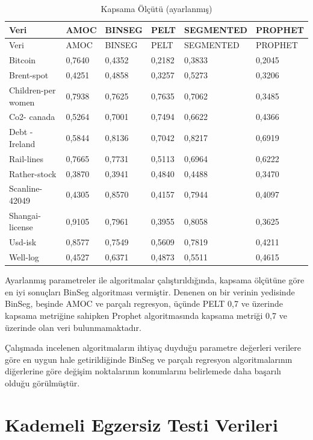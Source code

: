 \documentclass[12pt,twoside]{deuthesis}
\begin{document}
\begin{longtable}[]{@{}llllll@{}}
\caption{\label{tab:nvar5} Kapsama Ölçütü (ayarlanmış)}\tabularnewline
\toprule\noalign{}
Veri & AMOC & BINSEG & PELT & SEGMENTED & PROPHET \\
\midrule\noalign{}
\endfirsthead
\toprule\noalign{}
Veri & AMOC & BINSEG & PELT & SEGMENTED & PROPHET \\
\midrule\noalign{}
\endhead
\bottomrule\noalign{}
\endlastfoot
Bitcoin & 0,7640 & 0,4352 & 0,2182 & 0,3833 & 0,2045 \\
Brent-spot & 0,4251 & 0,4858 & 0,3257 & 0,5273 & 0,3206 \\
Children-per women & 0,7938 & 0,7625 & 0,7635 & 0,7062 & 0,3485 \\
Co2- canada & 0,5264 & 0,7001 & 0,7494 & 0,6622 & 0,4366 \\
Debt -Ireland & 0,5844 & 0,8136 & 0,7042 & 0,8217 & 0,6919 \\
Rail-lines & 0,7665 & 0,7731 & 0,5113 & 0,6964 & 0,6222 \\
Rather-stock & 0,3870 & 0,3941 & 0,4840 & 0,4488 & 0,3470 \\
Scanline-42049 & 0,4305 & 0,8570 & 0,4157 & 0,7944 & 0,4097 \\
Shangai-license & 0,9105 & 0,7961 & 0,3955 & 0,8058 & 0,3625 \\
Usd-isk & 0,8577 & 0,7549 & 0,5609 & 0,7819 & 0,4211 \\
Well-log & 0,4527 & 0,6371 & 0,4873 & 0,5511 & 0,4615 \\
\end{longtable}

Ayarlanmış parametreler ile algoritmalar çalıştırıldığında, kapsama ölçütüne göre en iyi sonuçları BinSeg algoritması vermiştir. Denenen on bir verinin yedisinde BinSeg, beşinde AMOC ve parçalı regresyon, üçünde PELT 0,7 ve üzerinde kapsama metriğine sahipken Prophet algoritmasında kapsama metriği 0,7 ve üzerinde olan veri bulunmamaktadır.

Çalışmada incelenen algoritmaların ihtiyaç duyduğu parametre değerleri verilere göre en uygun hale getirildiğinde BinSeg ve parçalı regresyon algoritmalarının diğerlerine göre değişim noktalarının konumlarını belirlemede daha başarılı olduğu görülmüştür.

\hypertarget{kademeli-egzersiz-testi-verileri}{%
\section{Kademeli Egzersiz Testi Verileri}\label{kademeli-egzersiz-testi-verileri}}
\end{document}
